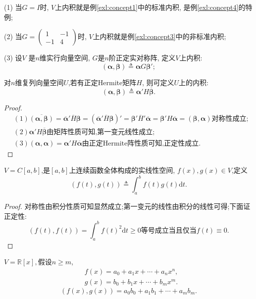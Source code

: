 \begin{notice}
  (1) 当$G=I$时, $V$上内积就是例\ref{exl:concept1}中的标准内积,
  是例\ref{exl:concept4}的特例;

  (2) 当$G=\begin{pmatrix}1&-1\\-1&4\end{pmatrix}$时,
  $V$上内积就是例\ref{exl:concept3}中的非标准内积;

  (3) 设\(V\) 是\(n\)维实行向量空间, \(G\)是\(n\)阶正定实对称阵,
  定义$V$上内积:
\[
(\bm{\alpha}, \bm{\beta}) \triangleq \bm{\alpha}G\bm{\beta}';
\]
\end{notice}

\begin{example}
  对$n$维复列向量空间$U$,若有正定Hermite矩阵$H$,
  则可定义$U$上的内积:
  \[
    (\bm{\alpha}, \bm{\beta}) \triangleq \bm{\alpha}'H\overline{\bm{\beta}}.
    \]
\end{example}

\begin{proof}
  \begin{align*}
    & (1) \overline{(\bm{\alpha},\bm{\beta})} =
    \overline{\bm{\alpha}}'\overline{H}\bm{\beta} =
    (\overline{\bm{\alpha}}'\overline{H}\bm{\beta})' =
    \bm{\beta}'\overline{H}'\overline{\bm{\alpha}} =
    \bm{\beta}'H\overline{\bm{\alpha}} =
    (\bm{\beta}, \bm{\alpha})\text{对称性成立};\\
    & (2) \bm{\alpha}'H\overline{\bm{\beta}}\text{由矩阵性质可知,第一变元线性成立};\\
    & (3) (\bm{\alpha},\bm{\alpha})= \bm{\alpha}'H\overline{\bm{\alpha}} \text{由正定Hermite阵性质可知,正定性成立}.
  \end{align*}
\end{proof}

\begin{example}
  $V=C[a,b]$,是$[a,b]$上连续函数全体构成的实线性空间,
  $f(x),g(x) \in V$,定义
  \[ (f(t), g(t)) \triangleq \int_a^bf(t)g(t)\mathrm{d}t. \]
\end{example}

\begin{proof}
  对称性由积分性质可知显然成立;第一变元的线性由积分的线性可得;下面证正定性:
  \[
    (f(t),f(t)) = \int_a^bf(t)^2\mathrm{d}t \geq 0
    \text{等号成立当且仅当}f(t) \equiv 0.
   \]
\end{proof}

\begin{example}
  $V=\mathbb{R}[x],$假设$n \geq m$,
  \begin{align*}
    & f(x) = a_0+a_1x+\cdots+a_nx^n, \\
    & g(x) = b_0+b_1x+\cdots+b_mx^m.
  \end{align*}
  \[(f(x),g(x)) = a_0b_0+a_1b_1+\cdots+a_mb_m. \]
\end{example}

